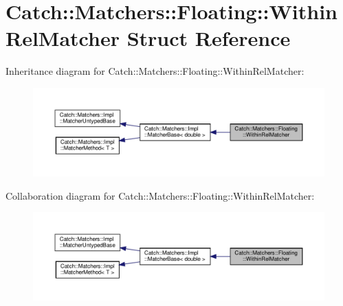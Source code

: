 \hypertarget{structCatch_1_1Matchers_1_1Floating_1_1WithinRelMatcher}{}\section{Catch\+:\+:Matchers\+:\+:Floating\+:\+:Within\+Rel\+Matcher Struct Reference}
\label{structCatch_1_1Matchers_1_1Floating_1_1WithinRelMatcher}


Inheritance diagram for Catch\+:\+:Matchers\+:\+:Floating\+:\+:Within\+Rel\+Matcher\+:
\nopagebreak
\begin{figure}[H]
\begin{center}
\leavevmode
\includegraphics[width=350pt]{structCatch_1_1Matchers_1_1Floating_1_1WithinRelMatcher__inherit__graph}
\end{center}
\end{figure}


Collaboration diagram for Catch\+:\+:Matchers\+:\+:Floating\+:\+:Within\+Rel\+Matcher\+:
\nopagebreak
\begin{figure}[H]
\begin{center}
\leavevmode
\includegraphics[width=350pt]{structCatch_1_1Matchers_1_1Floating_1_1WithinRelMatcher__coll__graph}
\end{center}
\end{figure}
